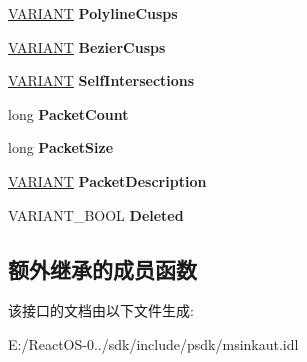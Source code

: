 \begin{DoxyCompactItemize}
\hyperlink{structtag_v_a_r_i_a_n_t}{V\+A\+R\+I\+A\+NT} {\bfseries Polyline\+Cusps}
\item 
\mbox{\label{interface_m_s_i_n_k_a_u_t_lib_1_1_i_ink_stroke_disp_ab6bf2d8f2fb9c17d544dcd6e007a9b41}} 
\hyperlink{structtag_v_a_r_i_a_n_t}{V\+A\+R\+I\+A\+NT} {\bfseries Bezier\+Cusps}
\item 
\mbox{\label{interface_m_s_i_n_k_a_u_t_lib_1_1_i_ink_stroke_disp_a88b5ee9d905be20569c8f3b2b69e5234}} 
\hyperlink{structtag_v_a_r_i_a_n_t}{V\+A\+R\+I\+A\+NT} {\bfseries Self\+Intersections}
\item 
\mbox{\label{interface_m_s_i_n_k_a_u_t_lib_1_1_i_ink_stroke_disp_afdbb47e1ede8bf3b004801c9c40cfdff}} 
long {\bfseries Packet\+Count}
\item 
\mbox{\label{interface_m_s_i_n_k_a_u_t_lib_1_1_i_ink_stroke_disp_af28f5829eeeb9a0c77396077b9aba2f7}} 
long {\bfseries Packet\+Size}
\item 
\mbox{\label{interface_m_s_i_n_k_a_u_t_lib_1_1_i_ink_stroke_disp_a838b45c7f1eacf345f6f5e62df531e39}} 
\hyperlink{structtag_v_a_r_i_a_n_t}{V\+A\+R\+I\+A\+NT} {\bfseries Packet\+Description}
\item 
\mbox{\label{interface_m_s_i_n_k_a_u_t_lib_1_1_i_ink_stroke_disp_aad2b2a63dd58c4d1cbde8009bb67df4d}} 
V\+A\+R\+I\+A\+N\+T\+\_\+\+B\+O\+OL {\bfseries Deleted}
\end{DoxyCompactItemize}
\subsection*{额外继承的成员函数}


该接口的文档由以下文件生成\+:\begin{DoxyCompactItemize}
\item 
E\+:/\+React\+O\+S-\/0../sdk/include/psdk/msinkaut.\+idl\end{DoxyCompactItemize}
